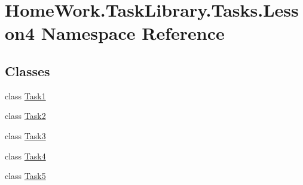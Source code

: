 \hypertarget{namespace_home_work_1_1_task_library_1_1_tasks_1_1_lesson4}{}\section{Home\+Work.\+Task\+Library.\+Tasks.\+Lesson4 Namespace Reference}
\label{namespace_home_work_1_1_task_library_1_1_tasks_1_1_lesson4}
\subsection*{Classes}
\begin{DoxyCompactItemize}
\item 
class \mbox{\hyperlink{class_home_work_1_1_task_library_1_1_tasks_1_1_lesson4_1_1_task1}{Task1}}
\item 
class \mbox{\hyperlink{class_home_work_1_1_task_library_1_1_tasks_1_1_lesson4_1_1_task2}{Task2}}
\item 
class \mbox{\hyperlink{class_home_work_1_1_task_library_1_1_tasks_1_1_lesson4_1_1_task3}{Task3}}
\item 
class \mbox{\hyperlink{class_home_work_1_1_task_library_1_1_tasks_1_1_lesson4_1_1_task4}{Task4}}
\item 
class \mbox{\hyperlink{class_home_work_1_1_task_library_1_1_tasks_1_1_lesson4_1_1_task5}{Task5}}
\end{DoxyCompactItemize}
